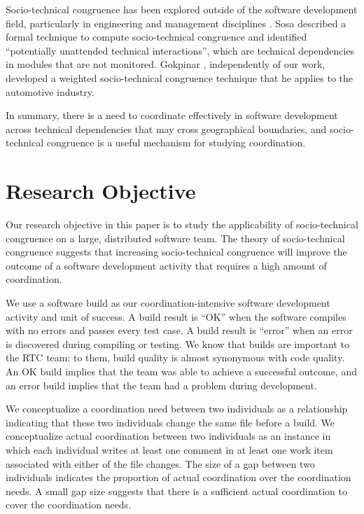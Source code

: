 Socio-technical congruence has been explored outside of the software development field, particularly in engineering and management disciplines \cite{henderson1990,sosa2004:manage,gokpinar2010,sosa2008}. Sosa \cite{sosa2008} described a formal technique to compute socio-technical congruence and identified ``potentially unattended technical interactions'', which are technical dependencies in modules that are not monitored. Gokpinar \cite{gokpinar2010}, independently of our work, developed a weighted socio-technical congruence technique that he applies to the automotive industry.

In summary, there is a need to coordinate effectively in software development across technical dependencies that may cross geographical boundaries, and socio-technical congruence is a useful mechanism for studying coordination.




\section{Research Objective}
\label{sec:objective}

Our research objective in this paper is to study the applicability of socio-technical congruence on a large, distributed software team. The theory of socio-technical congruence suggests that increasing socio-technical congruence will improve the outcome of a software development activity that requires a high amount of coordination.

We use a software build as our coordination-intensive software development activity and unit of success. A build result is ``OK'' when the software compiles with no errors and passes every test case. A build result is ``error'' when an error is discovered during compiling or testing. We know that builds are important to the RTC team: to them, build quality is almost synonymous with code quality. An OK build implies that the team was able to achieve a successful outcome, and an error build implies that the team had a problem during development.

We conceptualize a coordination need between two individuals as a relationship indicating that these two individuals change the same file before a build. We conceptualize actual coordination between two individuals as an instance in which each individual writes at least one comment in at least one work item associated with either of the file changes. The size of a gap between two individuals indicates the proportion of actual coordination over the coordination needs. A small gap size suggests that there is a sufficient actual coordination to cover the coordination needs.

